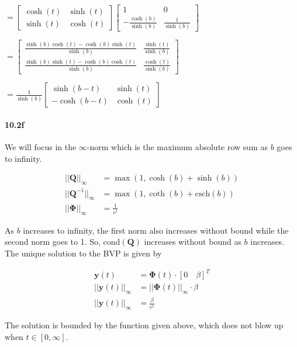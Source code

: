 \documentclass[a4paper, 11pt]{article}
\begin{document}
	$=\left[\begin{array}{cc}
	\cosh(t) & \sinh(t)\\
	\sinh(t) & \cosh(t)
	\end{array}\right]\left[\begin{array}{cc}
	1 & 0\\
	-\frac{\cosh(b)}{\sinh(b)} & \frac{1}{\sinh(b)}
	\end{array}\right]$
	
	$=\left[\begin{array}{cc}
	\frac{\sinh(b)\cosh(t)-\cosh(b)\sinh(t)}{\sinh(b)} & \frac{\sinh(t)}{\sinh(b)}\\
	\frac{\sinh(b)\sinh(t)-\cosh(b)\cosh(t)}{\sinh(b)} & \frac{\cosh(t)}{\sinh(b)}
	\end{array}\right]$
	
	$=$$\frac{1}{\sinh(b)}\left[\begin{array}{cc}
	\sinh(b-t) & \sinh(t)\\
	-\cosh(b-t) & \cosh(t)
	\end{array}\right]$
	
	
	\paragraph{10.2f}
	We will focus in the $\infty$-norm which is the maximum absolute row sum as $b$ goes to infinity.
	
	\begin{align*}
	||\mathbf{Q}||_{\infty} &= \max\left( 1, \cosh(b) + \sinh(b) \right)\\
	||\mathbf{Q}^{-1}||_{\infty} &= \max\left( 1, \coth(b) + \text{csch}(b) \right)\\
	||\mathbf{\Phi}||_{\infty} &= \frac{1}{e^t}
	\end{align*}
	
	As $b$ increases to infinity, the first norm also increases without bound while the second norm goes to 1. So, $\text{cond}(\mathbf{Q})$ increases without bound as $b$ increases. The unique solution to the BVP is given by
	
	\begin{align*}
	\mathbf{y}(t) &= \mathbf{\Phi}(t) \cdot [0 \quad \beta]^T\\
	||\mathbf{y}(t)||_{\infty} &= ||\mathbf{\Phi}(t)||_{\infty} \cdot \beta\\
	||\mathbf{y}(t)||_{\infty} &= \frac{\beta}{e^t}
	\end{align*}
	
	The solution is bounded by the function given above, which does not blow up when $t \in [0, \infty]$.
	
\end{document}
